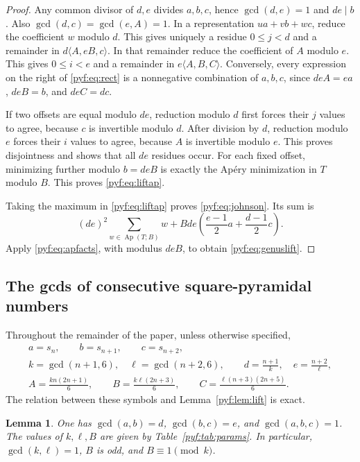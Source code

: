 \documentclass[11pt,a4paper]{article}
\numberwithin{equation}{section}
\newtheorem{lemma}[theorem]{Lemma}
\theoremstyle{definition}
\newcommand{\Ap}{\operatorname{Ap}}
\begin{document}
\begin{proof}
Any common divisor of $d,e$ divides $a,b,c$, hence $\gcd(d,e)=1$ and
$de\mid b$. Also $\gcd(d,c)=\gcd(e,A)=1$.
In a representation $ua+vb+wc$, reduce the coefficient $w$ modulo $d$.
This gives uniquely a residue $0\leq j<d$ and a remainder in
$d\langle A,eB,c\rangle$. In that remainder reduce the coefficient of $A$
modulo $e$. This gives $0\leq i<e$ and a remainder in
$e\langle A,B,C\rangle$. Conversely, every expression on the right of
\eqref{pyf:eq:rect} is a nonnegative combination of $a,b,c$, since
$deA=ea$, $deB=b$, and $deC=dc$.

If two offsets are equal modulo $de$, reduction modulo $d$ first forces
their $j$ values to agree, because $c$ is invertible modulo $d$. After
division by $d$, reduction modulo $e$ forces their $i$ values to agree,
because $A$ is invertible modulo $e$. This proves disjointness and shows
that all $de$ residues occur. For each fixed offset, minimizing further
modulo $b=deB$ is exactly the Ap\'ery minimization in $T$ modulo $B$.
This proves \eqref{pyf:eq:liftap}.

Taking the maximum in \eqref{pyf:eq:liftap} proves \eqref{pyf:eq:johnson}.
Its sum is
\[
(de)^2\sum_{w\in\Ap(T;B)}w
+Bde\left(\frac{e-1}{2}a+\frac{d-1}{2}c\right).
\]
Apply \eqref{pyf:eq:apfacts}, with modulus $deB$, to obtain
\eqref{pyf:eq:genuslift}.
\end{proof}

\subsection{The gcds of consecutive square-pyramidal numbers}

Throughout the remainder of the paper, unless otherwise specified,
\begin{equation}\label{pyf:eq:params}
\begin{gathered}
a=s_n,\qquad b=s_{n+1},\qquad c=s_{n+2},\\
k=\gcd(n+1,6),\quad \ell=\gcd(n+2,6),\qquad
 d=\frac{n+1}{k},\quad e=\frac{n+2}{\ell},\\
A=\frac{k n(2n+1)}6,\qquad
B=\frac{k\ell(2n+3)}6,\qquad
C=\frac{\ell(n+3)(2n+5)}6.
\end{gathered}
\end{equation}
The relation between these symbols and Lemma~\ref{pyf:lem:lift} is exact.

\begin{lemma}\label{pyf:lem:gcd}
One has $\gcd(a,b)=d$, $\gcd(b,c)=e$, and $\gcd(a,b,c)=1$.
The values of $k,\ell,B$ are given by Table~\ref{pyf:tab:params}. In particular,
$\gcd(k,\ell)=1$, $B$ is odd, and $B\equiv1\pmod{k}$.
\end{lemma}
\end{document}
